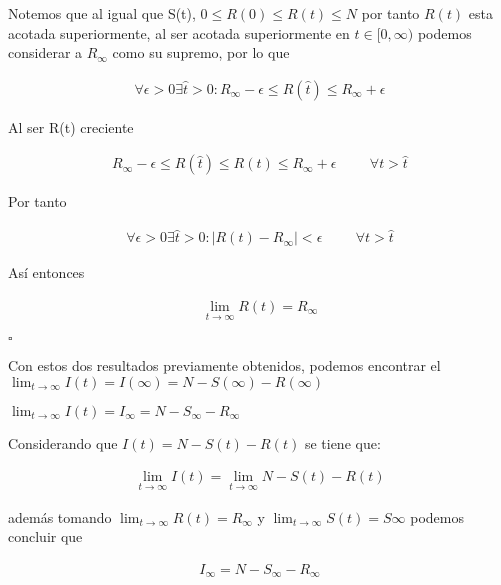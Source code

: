 \begin{Dem}
Notemos que al igual que S(t), $0 \leq R(0) \leq R(t) \leq N$ por tanto  $R(t)$ esta acotada superiormente, al ser acotada superiormente en $t \in [0, \infty)$ podemos considerar a $R_{\infty}$ como su supremo, por lo que
 
 \begin{align*}
\forall \epsilon >0  \exists \hat{t} > 0 : R_{\infty} - \epsilon \leq R(\hat{t}) \leq R_{\infty} +  \epsilon
 \end{align*}
 
Al ser R(t) creciente 

\begin{align*}
R_{\infty} - \epsilon \leq R(\hat{t}) \leq R(t) \leq R_{\infty} +  \epsilon  \hspace{1cm} \forall t  > \hat{t} 
\end{align*}

Por tanto 

\begin{align*}
\forall \epsilon > 0  \exists \hat{t} > 0 : |R(t) -  R_{\infty}| <  \epsilon \hspace{1cm} \forall t  > \hat{t} 
\end{align*}

Así entonces

\begin{align*}
\lim_{t \to \infty} R(t) = R_{\infty}
\end{align*}

\end{Dem}

\hfill	$\square$

Con estos dos resultados previamente obtenidos, podemos encontrar el $\lim_{t \to \infty} I(t) = I(\infty) = N - S(\infty) - R(\infty)$

\begin{Af}
$\lim_{t \to \infty} I(t) = I_{\infty} = N - S_{\infty} - R_{\infty}$
\end{Af}

\begin{Dem}

Considerando que $I (t) = N - S(t) - R(t)$ se tiene que: 

\begin{align*}
\lim_{t \to \infty} I(t)  = \lim_{t \to \infty}  N - S (t) - R(t) 
\end{align*}

además tomando $\lim_{t \to \infty} R(t) = R_{\infty}$ y $\lim_{t \to \infty} S(t) = S{\infty}$ podemos concluir que 

\begin{align*}
 I_{\infty}  = N - S_{\infty} - R_{\infty}
\end{align*}

\end{Dem}

